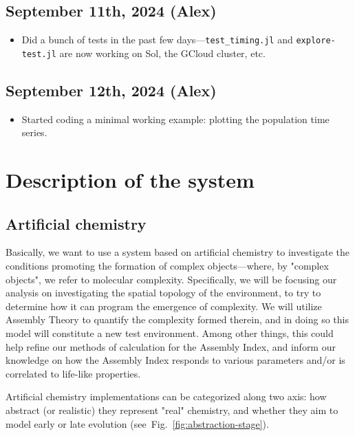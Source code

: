 \documentclass[11pt]{book}
\begin{document}
\section{September 11th, 2024  (Alex)}

\begin{itemize}
    \item Did a bunch of tests in the past few days—\texttt{test\_timing.jl} and \texttt{explore-test.jl} are now working on Sol, the GCloud cluster, etc.
\end{itemize}

\section{September 12th, 2024  (Alex)}

\begin{itemize}
    \item Started coding a minimal working example: plotting the population time series.
\end{itemize}

\chapter{Description of the system}

\section{Artificial chemistry}

Basically, we want to use a system based on artificial chemistry to investigate the conditions promoting the formation of complex objects---where, by "complex objects", we refer to molecular complexity. Specifically, we will be focusing our analysis on investigating the spatial topology of the environment, to try to determine how it can program the emergence of complexity. We will utilize Assembly Theory to quantify the complexity formed therein, and in doing so this model will constitute a new test environment. Among other things, this could help refine our methods of calculation for the Assembly Index, and inform our knowledge on how the Assembly Index responds to various parameters and/or is correlated to life-like properties.

Artificial chemistry implementations can be categorized along two axis: how abstract (or realistic) they represent "real" chemistry, and whether they aim to model early or late evolution (see~Fig.~\ref{fig:abstraction-stage}).
\end{document}
